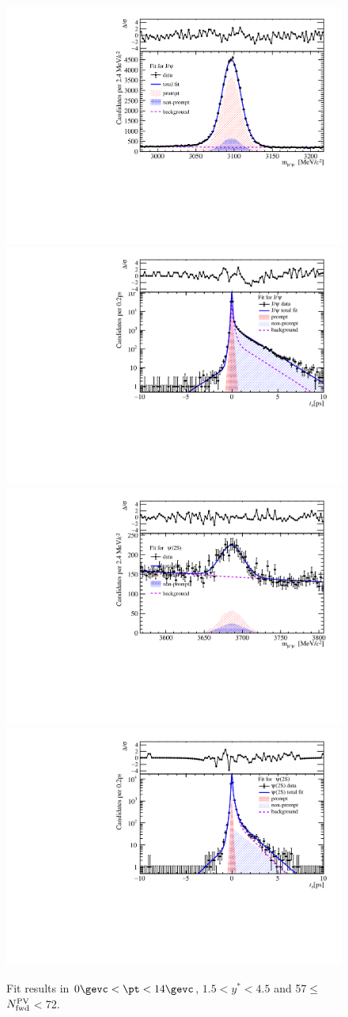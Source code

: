 \begin{figure}[H]
\begin{center}
\includegraphics[width=0.45\linewidth]{pdf/pPb/FWorkdir/TwoDimFit/ProjMass/Jpsi_n4y1pt1.pdf}
\includegraphics[width=0.45\linewidth]{pdf/pPb/FWorkdir/TwoDimFit/ProjTz/Jpsi_n4y1pt1.pdf}
\vspace*{-0.5cm}
\includegraphics[width=0.45\linewidth]{pdf/pPb/FWorkdir/TwoDimFit/ProjMass/Psi2S_n4y1pt1.pdf}
\includegraphics[width=0.45\linewidth]{pdf/pPb/FWorkdir/TwoDimFit/ProjTz/Psi2S_n4y1pt1.pdf}
\vspace*{-0.5cm}
\end{center}
\caption{Fit results in $0\gevc<\pt<14\gevc$, $1.5<y^*<4.5$ and 57$\leq$$N_{\rm fwd}^{\rm PV}$$<$72.}
\end{figure}
